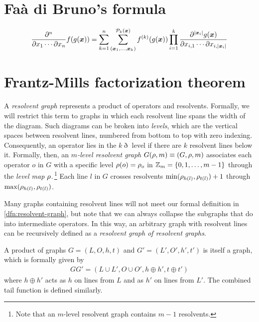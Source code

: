 \documentclass[11pt]{article}
\numberwithin{equation}{section}
\begin{document}
\appendix
\section{Fa\`a di Bruno's formula}

\begin{thm}
\begin{align}
  \pd{^n}{x_1\cd \pt x_n}
  f(g(\bm{x}))
=
  \sum_{k=1}^n
  \sum_{(\bm{x}_1,\ld,\bm{x}_k)}^{\mc{P}_k(\bm{x})}
  f\ord{k}(g(\bm{x}))
  \prod_{i=1}^k
  \pd{
    ^{|\bm{x}_i|}
    g(\bm{x})
  }{
    x_{i,1}
  \cd
    \pt
    x_{i,|\bm{x}_i|}
  }
\end{align}
\end{thm}



\section{Frantz-Mills factorization theorem}

\begin{dfn}
\label{dfn:resolvent-graph}
A \textit{resolvent graph} represents a product of operators and resolvents.
Formally, we will restrict this term to graphs in which each resolvent line spans the width of the diagram.
Such diagrams can be broken into \textit{levels}, which are the vertical spaces between resolvent lines, numbered from bottom to top with zero indexing.
Consequently, an operator lies in the $k\eth$ level if there are $k$ resolvent lines below it.
Formally, then, an \textit{$m$-level resolvent graph} $G(\rho ,m)\equiv(G,\rho ,m)$ associates each operator $o$ in $G$ with a specific level $\rho (o)=\rho _o$ in $\mathbb{Z}_m=\{0,1,\ldots,m-1\}$ through the \textit{level map} $\rho $.\,\footnote{
  Note that an $m$-level resolvent graph contains $m-1$ resolvents.
}
Each line $l$ in $G$ crosses resolvents
$
  \mathrm{min}(\rho _{h(l)},\rho _{t(l)}) + 1
$
through
$
  \mathrm{max}(\rho _{h(l)},\rho _{t(l)})
$.
\end{dfn}

\begin{rmk}
Many graphs containing resolvent lines will not meet our formal definition in \cref{dfn:resolvent-graph}, but note that we can always collapse the subgraphs that do into intermediate operators.
In this way, an arbitrary graph with resolvent lines can be recursively defined as a \textit{resolvent graph of resolvent graphs}.
\end{rmk}

\begin{rmk}
A product of graphs $G=(L,O,h,t)$ and $G'=(L',O',h',t')$ is itself a graph, which is formally given by
\begin{align}
  GG'
=
  (L\cup L', O\cup O', h\oplus h', t\oplus t')
\end{align}
where $h\oplus h'$ acts as $h$ on lines from $L$ and as $h'$ on lines from $L'$.
The combined tail function is defined similarly.
\end{rmk}
\end{document}
